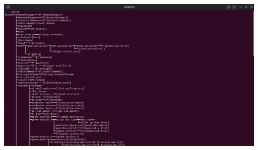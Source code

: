 \begin{qsolve}
	\begin{center}
		\includegraphics[width=\textwidth]{pics/img5.png}
	\end{center}
\end{qsolve}
